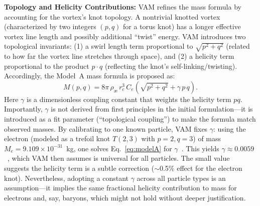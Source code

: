 \documentclass[a4paper,12pt]{article}
\begin{document}
    \textbf{Topology and Helicity Contributions:} VAM refines the mass formula by accounting for the vortex’s knot topology. A nontrivial knotted vortex (characterized by two integers $(p,q)$ for a torus knot) has a longer effective vortex line length and possibly additional ``twist'' energy. VAM introduces two topological invariants: (1) a swirl length term proportional to $\sqrt{p^2+q^2}$ (related to how far the vortex line stretches through space), and (2) a helicity term proportional to the product $p\cdot q$ (reflecting the knot’s self-linking/twisting). Accordingly, the Model~A mass formula is proposed as:
    \begin{equation}
        M(p,q) = 8\pi\,\rho_{\text{\ae}}\,r_c^3\,C_e \left(\sqrt{p^2+q^2} + \gamma\,p\,q\right).
        \label{eq:modelA}
    \end{equation}
    Here $\gamma$ is a dimensionless coupling constant that weights the helicity term $pq$. Importantly, $\gamma$ is not derived from first principles in the initial formulation---it is introduced as a fit parameter (``topological coupling'') to make the formula match observed masses. By calibrating to one known particle, VAM fixes $\gamma$: using the electron (modeled as a trefoil knot $T(2,3)$ with $p=2, q=3$) of mass $M_e=9.109\times10^{-31}$~kg, one solves Eq.~\eqref{eq:modelA} for $\gamma$~\cite{vamfit}. This yields $\gamma \approx 0.0059$~\cite{vamfit}, which VAM then assumes is universal for all particles. The small value suggests the helicity term is a subtle correction ($\sim$0.5\% effect for the electron knot). Nevertheless, adopting a constant $\gamma$ across all particle types is an assumption---it implies the same fractional helicity contribution to mass for electrons and, say, baryons, which might not hold without deeper justification.
\end{document}
